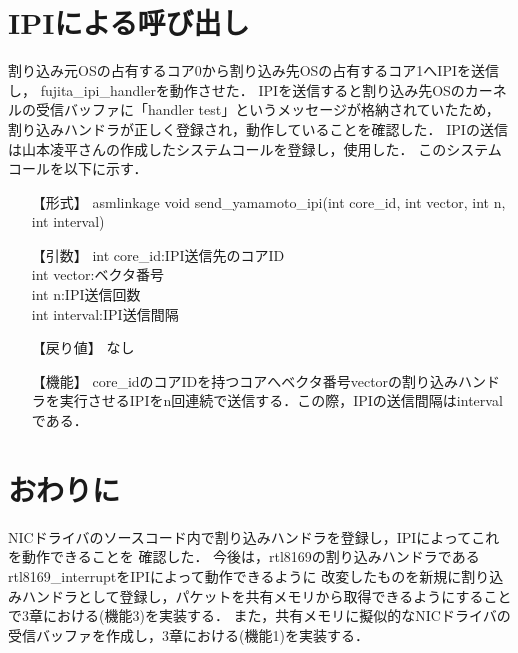 \documentclass[12pt]{jsarticle}
\begin{document}
\section{IPIによる呼び出し}
割り込み元OSの占有するコア0から割り込み先OSの占有するコア1へIPIを送信し，
fujita\_ipi\_handlerを動作させた．
IPIを送信すると割り込み先OSのカーネルの受信バッファに「handler test」というメッセージが格納されていたため，
割り込みハンドラが正しく登録され，動作していることを確認した．
IPIの送信は山本凌平さんの作成したシステムコールを登録し，使用した．
このシステムコールを以下に示す．
\begin{itemize}
\item [【形式】] asmlinkage void send\_yamamoto\_ipi(int core\_id, int vector, int n, int interval)
\item [【引数】] int core\_id:IPI送信先のコアID\\int vector:ベクタ番号\\int n:IPI送信回数\\int interval:IPI送信間隔
\item [【戻り値】] なし
\item [【機能】] core\_idのコアIDを持つコアへベクタ番号vectorの割り込みハンドラを実行させるIPIをn回連続で送信する．この際，IPIの送信間隔はintervalである．
\end{itemize}


\section{おわりに}
NICドライバのソースコード内で割り込みハンドラを登録し，IPIによってこれを動作できることを
確認した．
今後は，rtl8169の割り込みハンドラであるrtl8169\_interruptをIPIによって動作できるように
改変したものを新規に割り込みハンドラとして登録し，パケットを共有メモリから取得できるようにすることで3章における(機能3)を実装する．
また，共有メモリに擬似的なNICドライバの受信バッファを作成し，3章における(機能1)を実装する．
\end{document}
